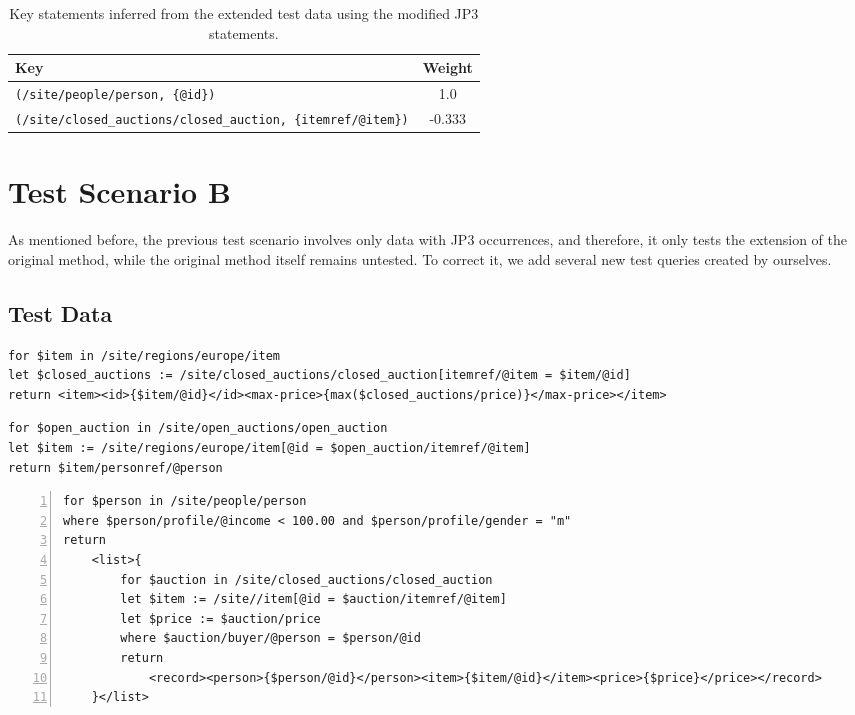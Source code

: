 \begin{table}
\begin{tabular}{|l|c|}
\hline
\textbf{Key} & \textbf{Weight} \\ \hline \hline
\texttt{(/site/people/person, \{@id\})} & 1.0 \\ \hline
\texttt{(/site/closed\_auctions/closed\_auction, \{itemref/@item\})} & -0.333 \\ \hline
\end{tabular}
\caption[Key statements inferred using the modified JP3 statements.]{Key statements inferred from the extended test data using the modified JP3 statements.}
\label{TAB_inferred_keys_3}
\end{table}

\section{Test Scenario B}
As mentioned before, the previous test scenario involves only data with JP3 occurrences, and therefore, it only tests the extension of the original method, while the original method itself remains untested. To correct it, we add several new test queries created by ourselves.

\subsection{Test Data}

\begin{lstlisting}[caption=Test query B1 containing a for join pattern occurrence., frame=single, label=listing_test_query_b1]
for $item in /site/regions/europe/item
let $closed_auctions := /site/closed_auctions/closed_auction[itemref/@item = $item/@id]
return <item><id>{$item/@id}</id><max-price>{max($closed_auctions/price)}</max-price></item>
\end{lstlisting}

\begin{lstlisting}[caption=Test query B2 containing a let join pattern occurrence., frame=single, label=listing_test_query_b2]
for $open_auction in /site/open_auctions/open_auction
let $item := /site/regions/europe/item[@id = $open_auction/itemref/@item]
return $item/personref/@person
\end{lstlisting}

\begin{lstlisting}[caption=Test query B3 containing let join pattern and JP3 occurrences., frame=single, label=listing_test_query_b3, numbers=left, numberstyle=\tiny]
for $person in /site/people/person
where $person/profile/@income < 100.00 and $person/profile/gender = "m"
return
    <list>{
        for $auction in /site/closed_auctions/closed_auction
        let $item := /site//item[@id = $auction/itemref/@item]
        let $price := $auction/price
        where $auction/buyer/@person = $person/@id
        return
            <record><person>{$person/@id}</person><item>{$item/@id}</item><price>{$price}</price></record>
    }</list>
\end{lstlisting}

